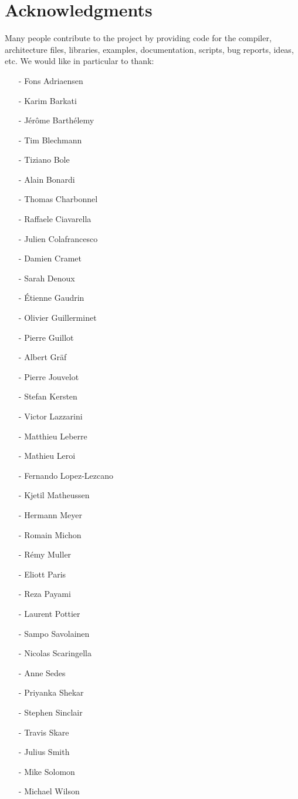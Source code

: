 \chapter{Acknowledgments}
\label{acknowledgments}

Many people contribute to the \faust project by providing code for the compiler, architecture files, libraries, examples, documentation, scripts, bug reports, ideas, etc. We would like in particular to thank:

\begin{itemize}
\setlength\itemsep{0em}
\item[-]Fons Adriaensen	
\item[-]Karim Barkati
\item[-]J\'er\^ome Barth\'elemy
\item[-]Tim Blechmann
\item[-]Tiziano Bole	
\item[-]Alain Bonardi
\item[-]Thomas Charbonnel
\item[-]Raffaele Ciavarella
\item[-]Julien Colafrancesco
\item[-]Damien Cramet
\item[-]Sarah Denoux
\item[-]\'Etienne Gaudrin
\item[-]Olivier Guillerminet
\item[-]Pierre Guillot
\item[-]Albert Gr\"af
\item[-]Pierre Jouvelot
\item[-]Stefan Kersten
\item[-]Victor Lazzarini
\item[-]Matthieu Leberre
\item[-]Mathieu Leroi
\item[-]Fernando Lopez-Lezcano
\item[-]Kjetil Matheussen
\item[-]Hermann Meyer
\item[-]Romain Michon
\item[-]R\'emy Muller
\item[-]Eliott Paris
\item[-]Reza Payami
\item[-]Laurent Pottier
\item[-]Sampo Savolainen
\item[-]Nicolas Scaringella
\item[-]Anne Sedes
\item[-]Priyanka Shekar
\item[-]Stephen Sinclair
\item[-]Travis Skare
\item[-]Julius Smith
\item[-]Mike Solomon
\item[-]Michael Wilson
\end{itemize}
